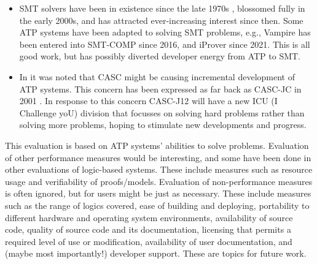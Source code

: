 \documentclass[runningheads]{llncs}
\begin{document}
\begin{itemize}
\item SMT solvers have been in existence since the late 1970s \cite{NO79}, blossomed fully
      in the early 2000s, and has attracted ever-increasing interest since then.
      Some ATP systems have been adapted to solving SMT problems, e.g., Vampire has been entered
      into SMT-COMP since 2016, and iProver since 2021.
      This is all good work, but has possibly diverted developer energy from ATP to SMT.
\item In \cite{SD24-CASC} it was noted that CASC might be causing incremental development of ATP
      systems.
      This concern has been expressed as far back as CASC-JC in 2001 \cite{PSS02}.
      In response to this concern CASC-J12 will have a new ICU (I Challenge yoU) division that
      focusses on solving hard problems rather than solving more problems, hoping to stimulate
      new developments and progress.
\end{itemize}

This evaluation is based on ATP systems' abilities to solve problems.
Evaluation of other performance measures would be interesting, and some have been done
in other evaluations of logic-based systems.
These include measures such as resource usage and verifiability of proofs/models.
Evaluation of non-performance measures is often ignored, but for users might be just as
necessary.
These include measures such as 
the range of logics covered, 
ease of building and deploying,
portability to different hardware and operating system environments, 
availability of source code, 
quality of source code and its documentation,
licensing that permits a required level of use or modification, 
availability of user documentation, 
and (maybe most importantly!)
developer support.
These are topics for future work.



\end{document}
